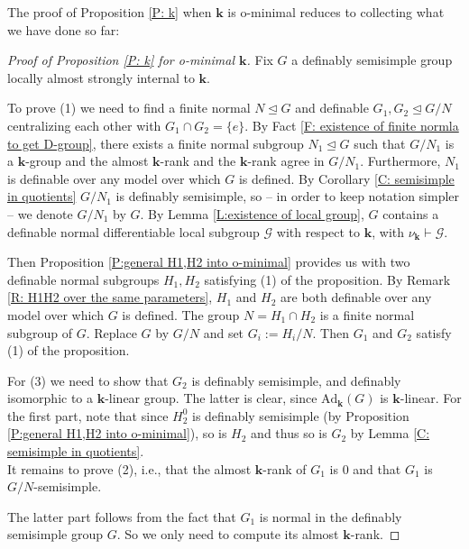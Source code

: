 \documentclass[11pt]{amsart}
\theoremstyle{definition}
\newcommand{\bk}{\textbf{k}}
\newcommand{\CG}{{\mathcal G}}
\newcommand{\0}{\emptyset}
\newcommand{\ad}{\mathrm{Ad}}
\begin{document}
   

The proof of Proposition \ref{P: k} when $\bk$ is o-minimal reduces to collecting what we have done so far: 
\begin{proof}[Proof of Proposition \ref{P: k} for o-minimal $\bk$]
    Fix $G$ a definably semisimple group locally almost strongly internal to $\bk$. 
   
    To prove (1) we need to find a finite normal $N\trianglelefteq G$ and definable  $G_1, G_2\trianglelefteq G/N$ centralizing each other with $G_1\cap G_2=\{e\}$.  By  Fact \ref{F: existence of finite normla to get D-group}, there exists  a finite normal  subgroup $N_1\trianglelefteq G$ such that $G/N_1$ is a $\bk$-group and the almost $\bk$-rank and the $\bk$-rank agree in $G/N_1$. Furthermore,  $N_1$ is definable over any model over which $G$ is defined. By Corollary \ref{C: semisimple in quotients} $G/N_1$ is definably semisimple, so -- in order to  keep notation simpler -- we  denote $G/N_1$ by $G$. By Lemma \ref{L:existence of local group}, $G$  contains a definable  normal differentiable local subgroup $\CG$ with respect to $\bk$, 
    with $\nu_{\bk}\vdash \CG$. 
    
    Then Proposition \ref{P:general H1,H2 into o-minimal} provides us with two definable normal subgroups $H_1, H_2$  satisfying (1) of the proposition.
    By Remark \ref{R: H1H2 over the same parameters}, $H_1$ and $H_2$ are both definable over any model over which $G$ is defined.   The group $N=H_1\cap H_2$ is a finite normal subgroup of $G$. Replace $G$ by $G/N$ and set $G_i:=H_i/N$.  Then $G_1$ and $G_2$ satisfy (1) of the proposition. 

    
    For (3) we need to show that $G_2$ is definably semisimple, and definably isomorphic to a $\bk$-linear group. The latter is clear, since $\ad_\bk(G)$ is $\bk$-linear.  For the first part,  note that since $H_2^0$ is definably semisimple (by Proposition \ref{P:general H1,H2 into o-minimal}), so is $H_2$ and thus so is $G_2$ by Lemma \ref{C: semisimple in quotients}. \\
    
    It remains to prove (2), i.e., that the almost $\bk$-rank of $G_1$ is $0$ and that $G_1$ is $G/N$-semisimple.
    
    The latter part follows from the fact that $G_1$ is normal in the definably semisimple group $G$. So we only need to compute its almost $\bk$-rank. %
        

\end{proof}
\end{document}
